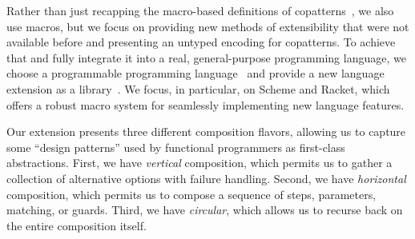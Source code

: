 Rather than just recapping the macro-based definitions of copatterns~\cite{LaforgueR17}, we also use macros, but we focus on providing new methods of extensibility that were not available before and presenting an untyped encoding for copatterns.
To achieve that and fully integrate it into a real, general-purpose programming language, we choose a programmable programming language~\cite{ProgrammablePL} and provide a new language extension as a library~\cite{LanguageLibrary}.
We focus, in particular, on Scheme and Racket, which offers a robust macro system for seamlessly implementing new language features.

Our extension presents three different composition flavors, allowing us to capture some ``design patterns'' used by functional programmers as first-class abstractions.
First, we have \emph{vertical} composition, which permits us to gather a collection of alternative options with failure handling.
Second, we have \emph{horizontal} composition, which permits us to compose a sequence of steps, parameters, matching, or guards.
Third, we have \emph{circular}, which allows us to recurse back on the entire composition itself.

